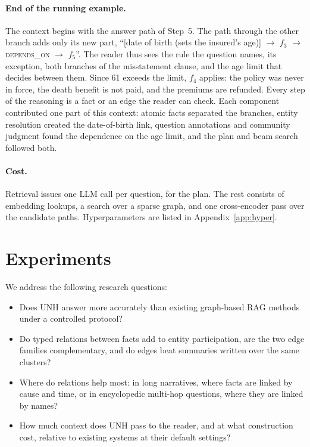 \documentclass[sigconf, review, anonymous]{acmart}
\newcommand{\sys}{UNH}
\newcommand{\rel}[1]{\textsc{#1}}            %
\begin{document}
\paragraph{\textbf{End of the running example.}}
The context begins with the answer path of Step~5. The path through the other branch adds only its new part, ``[date of birth (sets the insured's age)] $\to$ $f_3$ $\to$ \rel{depends\_on} $\to$ $f_5$''. The reader thus sees the rule the question names, its exception, both branches of the misstatement clause, and the age limit that decides between them. Since 61 exceeds the limit, $f_4$ applies: the policy was never in force, the death benefit is not paid, and the premiums are refunded. Every step of the reasoning is a fact or an edge the reader can check. Each component contributed one part of this context: atomic facts separated the branches, entity resolution created the date-of-birth link, question annotations and community judgment found the dependence on the age limit, and the plan and beam search followed both.

\paragraph{\textbf{Cost.}}
Retrieval issues one LLM call per question, for the plan. The rest consists of embedding lookups, a search over a sparse graph, and one cross-encoder pass over the candidate paths. Hyperparameters are listed in Appendix~\ref{app:hyper}.


\section{Experiments}
\label{sec:experiments}

We address the following research questions:
\begin{itemize}
    \item[\textbf{RQ1}] Does \sys{} answer more accurately than existing graph-based RAG methods under a controlled protocol?
    \item[\textbf{RQ2}] Do typed relations between facts add to entity participation, are the two edge families complementary, and do edges beat summaries written over the same clusters?
    \item[\textbf{RQ3}] Where do relations help most: in long narratives, where facts are linked by cause and time, or in encyclopedic multi-hop questions, where they are linked by names?
    \item[\textbf{RQ4}] How much context does \sys{} pass to the reader, and at what construction cost, relative to existing systems at their default settings?
\end{itemize}
\end{document}
